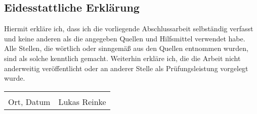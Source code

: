 \subsection*{Eidesstattliche Erklärung}
Hiermit erkläre ich, dass ich die vorliegende Abschlussarbeit selbständig verfasst und keine anderen als die angegeben Quellen und Hilfsmittel verwendet habe.
Alle Stellen, die wörtlich oder sinngemäß aus den Quellen entnommen wurden, sind als solche kenntlich gemacht.
Weiterhin erkläre ich, die die Arbeit nicht anderweitig veröffentlicht oder an anderer Stelle als Prüfungsleistung vorgelegt wurde.

\vspace{50px}

\begin{tabular}{@{}p{2.5in}p{2.5in}@{}}
  \dotfill & \dotfill \\
  Ort, Datum & Lukas Reinke \\[5\bigskipamount]
\end{tabular}

\pagebreak